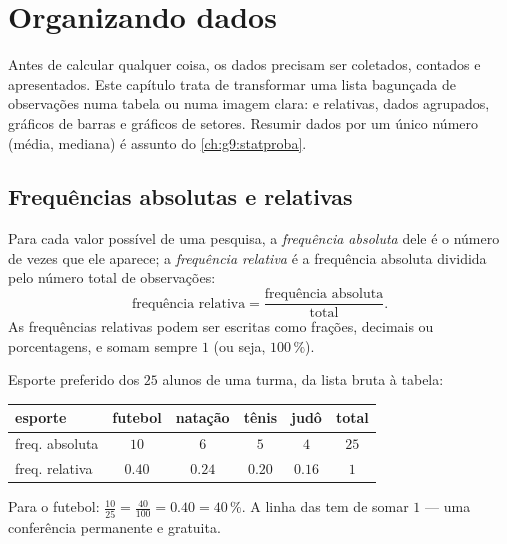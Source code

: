\chapter{Organizando dados}\label{ch:g7:stats}

Antes de calcular qualquer coisa, os dados precisam ser coletados,
contados e apresentados. Este capítulo trata de transformar uma lista
bagunçada de observações numa tabela ou numa imagem clara:  e relativas, dados agrupados, gráficos de barras e gráficos
de setores. Resumir dados por um único número (média, mediana) é
assunto do \cref{ch:g9:statproba}.

\section{Frequências absolutas e relativas}

\begin{definition}\label{def:g7:stats:frequency}
Para cada valor possível de uma pesquisa, a \emph{frequência
absoluta} dele é o número de vezes que ele
aparece; a \emph{frequência relativa} é a
frequência absoluta dividida pelo número total de observações:
\[
\text{frequência relativa}
= \frac{\text{frequência absoluta}}{\text{total}} .
\]
As frequências relativas podem ser escritas como frações, decimais ou
porcentagens, e somam sempre $1$ (ou seja, $100\,\%$).
\end{definition}

\begin{example}\label{ex:g7:stats:frequency}
Esporte preferido dos $25$ alunos de uma turma, da lista bruta à
tabela:
\begin{center}
\renewcommand{\arraystretch}{1.3}
\begin{tabular}{l|cccc|c}
esporte & futebol & natação & tênis & judô & total \\
\hline
freq. absoluta & $10$ & $6$ & $5$ & $4$ & $25$ \\
freq. relativa & $0.40$ & $0.24$ & $0.20$ & $0.16$ & $1$ \\
\end{tabular}
\end{center}
Para o futebol: $\frac{10}{25} = \frac{40}{100} = 0.40 = 40\,\%$. A
linha das  tem de somar $1$ --- uma conferência
permanente e gratuita.
\end{example}

